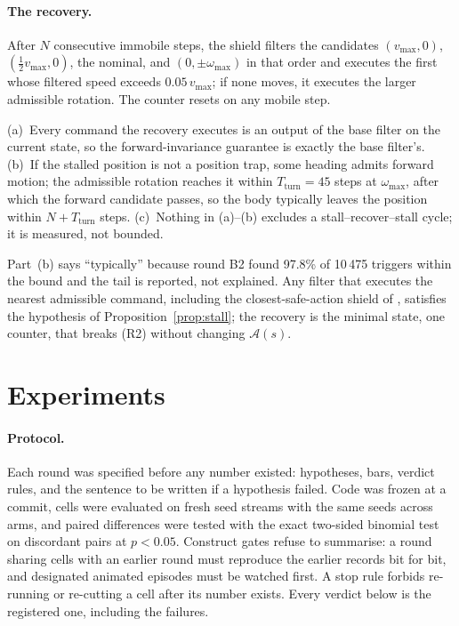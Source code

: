\documentclass{l4dc2027}
\newcommand{\vmax}{v_{\max}}
\newcommand{\wmax}{\omega_{\max}}
\newcommand{\adm}{\mathcal{A}}
\begin{document}
\paragraph{The recovery.} After $N$ consecutive immobile steps, the shield filters the candidates $(\vmax,0)$, $(\tfrac12\vmax,0)$, the nominal, and $(0,\pm\wmax)$ in that order and executes the first whose filtered speed exceeds $0.05\,\vmax$; if none moves, it executes the larger admissible rotation. The counter resets on any mobile step.

\begin{proposition}[Recovery]\label{prop:recovery}
(a)~Every command the recovery executes is an output of the base filter on the current state, so the forward-invariance guarantee is exactly the base filter's. (b)~If the stalled position is not a position trap, some heading admits forward motion; the admissible rotation reaches it within $T_{\mathrm{turn}} = 45$ steps at $\wmax$, after which the forward candidate passes, so the body typically leaves the position within $N + T_{\mathrm{turn}}$ steps. (c)~Nothing in (a)--(b) excludes a stall--recover--stall cycle; it is measured, not bounded.
\end{proposition}

Part~(b) says ``typically'' because round B2 found 97.8\% of 10\,475 triggers within the bound and the tail is reported, not explained. Any filter that executes the nearest admissible command, including the closest-safe-action shield of \citet{kim2025realizable}, satisfies the hypothesis of Proposition~\ref{prop:stall}; the recovery is the minimal state, one counter, that breaks (R2) without changing $\adm(s)$.

\section{Experiments}\label{sec:experiments}

\paragraph{Protocol.} Each round was specified before any number existed: hypotheses, bars, verdict rules, and the sentence to be written if a hypothesis failed. Code was frozen at a commit, cells were evaluated on fresh seed streams with the same seeds across arms, and paired differences were tested with the exact two-sided binomial test on discordant pairs at $p < 0.05$. Construct gates refuse to summarise: a round sharing cells with an earlier round must reproduce the earlier records bit for bit, and designated animated episodes must be watched first. A stop rule forbids re-running or re-cutting a cell after its number exists. Every verdict below is the registered one, including the failures.
\end{document}
